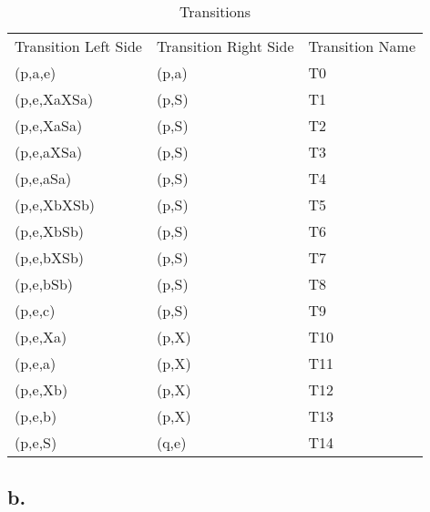 \documentclass[12pt]{article}
\begin{document}
\begin{table}[H]
\centering
\caption{Transitions}
\begin{tabular}{lll}
Transition Left Side & Transition Right Side & Transition Name \\
(p,a,e)              & (p,a)                 & T0              \\
(p,e,XaXSa)          & (p,S)                 & T1              \\
(p,e,XaSa)           & (p,S)                 & T2              \\
(p,e,aXSa)           & (p,S)                 & T3              \\
(p,e,aSa)            & (p,S)                 & T4              \\
(p,e,XbXSb)          & (p,S)                 & T5              \\
(p,e,XbSb)           & (p,S)                 & T6              \\
(p,e,bXSb)           & (p,S)                 & T7              \\
(p,e,bSb)            & (p,S)                 & T8              \\
(p,e,c)              & (p,S)                 & T9              \\
(p,e,Xa)             & (p,X)                 & T10             \\
(p,e,a)              & (p,X)                 & T11             \\
(p,e,Xb)             & (p,X)                 & T12             \\
(p,e,b)              & (p,X)                 & T13             \\
(p,e,S)              & (q,e)                 & T14            
\end{tabular}
\end{table}

\subsection*{b.}
\end{document}
